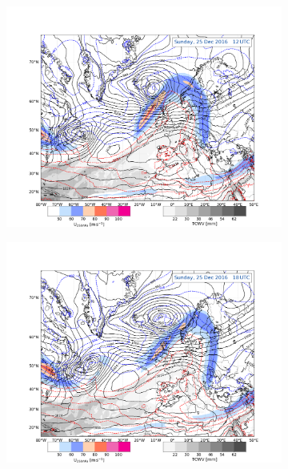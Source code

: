 \begin{figure}[ht!]
	\begin{subfigure}[b]{0.49\textwidth}
		\includegraphics[trim={4.2cm 0cm 4.3cm 5.1cm},clip,
		width=\textwidth]{./fig_Geopot_Jet/20161225_12}
		\caption{} \label{fig:GP25}
	\end{subfigure}
	\begin{subfigure}[b]{0.49\textwidth}
		\includegraphics[trim={4.2cm 0cm 4.3cm 5.1cm},clip,
		width=\textwidth]{./fig_Geopot_Jet/20161225_18}
		\caption{} \label{fig:GP25_18}
	\end{subfigure}
	\begin{subfigure}[b]{0.49\textwidth}

\end{subfigure}
\end{figure}
